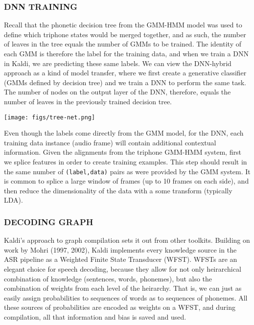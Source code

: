 \documentclass[10pt,a4paper]{article}
\begin{document}
\subsubsection*{DNN TRAINING}

Recall that the phonetic decision tree from the GMM-HMM model was used to define which triphone states would be merged together, and as such, the number of leaves in the tree equals the number of GMMs to be trained. The identity of each GMM is therefore the label for the training data, and when we train a DNN in Kaldi, we are predicting these same labels. We can view the DNN-hybrid approach as a kind of model transfer, where we first create a generative classifier (GMMs defined by decision tree) and we train a DNN to perform the same task. The number of nodes on the output layer of the DNN, therefore, equals the number of leaves in the previously trained decision tree.


\begin{center}
  \texttt{[image: figs/tree-net.png]}
\end{center}



Even though the labels come directly from the GMM model, for the DNN, each training data instance (audio frame) will contain additional contextual information. Given the alignments from the triphone GMM-HMM system, first we splice features in order to create training examples. This step should result in the same number of \texttt{(label,data)} pairs as were provided by the GMM system. It is common to splice a large window of frames (up to 10 frames on each side), and then reduce the dimensionality of the data with a some transform (typically LDA).
    

\subsubsection*{DECODING GRAPH}

Kaldi's approach to graph compilation sets it out from other toolkits. Building on work by Mohri (1997, 2002), Kaldi implements every knowledge source in the ASR pipeline as a Weighted Finite State Transducer (WFST). WFSTs are an elegant choice for speech decoding, because they allow for not only heirarchical combination of knowledge (sentences, words, phonemes), but also the combination of weights from each level of the heirarchy. That is, we can just as easily assign probabilities to sequences of words as to sequences of phonemes. All these sources of probabilities are encoded as weights on a WFST, and during compilation, all that information and bias is saved and used.
\end{document}
